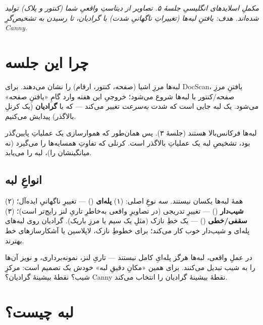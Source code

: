 \documentclass[12pt,a4paper]{article}
\begin{document}

{\small\itshape مکملِ اسلایدهای انگلیسیِ جلسهٔ ۵. تصاویر از دیتاستِ واقعیِ شما (کنتور و پلاک) تولید شده‌اند. هدف: یافتنِ لبه‌ها (تغییراتِ ناگهانیِ شدت) با گرادیان، تا رسیدن به تشخیص‌گرِ Canny.}

\vspace{0.5cm}
\tableofcontents
\vspace{1cm}

\section{چرا این جلسه}

لبه‌ها مرزِ اشیا (صفحه، کنتور، ارقام) را نشان می‌دهند. برای DocScan، یافتنِ مرزِ صفحه/کنتور با
لبه‌ها شروع می‌شود؛ خروجیِ این هفته وارد گامِ «یافتنِ صفحه» می‌شود. یک لبه جایی است که شدت
\emph{به‌سرعت} تغییر می‌کند — که با \textbf{گرادیان} (یک کرنلِ بالاگذر) پیدایش می‌کنیم.

\begin{nokte}
لبه‌ها فرکانس‌بالا هستند (جلسهٔ ۳). پس همان‌طور که هموارسازی یک عملیاتِ پایین‌گذر بود، تشخیصِ لبه
یک عملیاتِ بالاگذر است. کرنلی که تفاوتِ همسایه‌ها را می‌گیرد (نه میانگینشان را)، لبه را می‌یابد.
\end{nokte}

\subsection{انواعِ لبه}

همهٔ لبه‌ها یکسان نیستند. سه نوعِ اصلی: (۱) \textbf{پله‌ای} () — تغییرِ ناگهانیِ ایده‌آل؛
(۲) \textbf{شیب‌دار} () — تغییرِ تدریجی (در تصاویرِ واقعی به‌خاطرِ تاریِ لنز رایج‌تر است)؛
(۳) \textbf{سقفی/خطی} () — یک خطِ نازک (مثلِ یک سیم یا مرزِ باریک). گرادیان روی
لبه‌های پله‌ای و شیب‌دار خوب کار می‌کند؛ برای خطوطِ نازک، لاپلاسین یا آشکارسازهای خط بهترند.

\begin{yaddasht}
در عملِ واقعی، لبه‌ها هرگز پله‌ایِ کامل نیستند — تاریِ لنز، نمونه‌برداری، و نویز آن‌ها را به شیب
تبدیل می‌کنند. برای همین «مکانِ دقیقِ لبه» خودش یک تصمیم است: مرکزِ شیب؟ نقطهٔ بیشینهٔ گرادیان؟
Canny نقطهٔ بیشینهٔ گرادیان را انتخاب می‌کند.
\end{yaddasht}

\section{لبه چیست؟}
\end{document}
